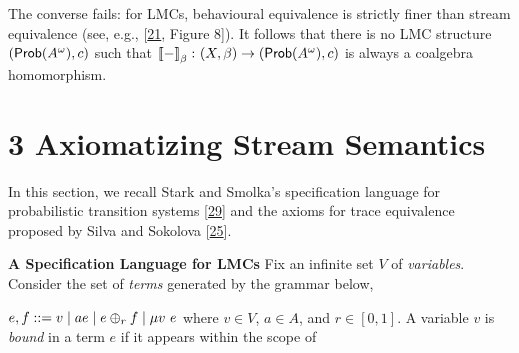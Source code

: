 \documentclass[11pt,a4paper]{amsart}
\begin{document}
\par\medskip
\hypertarget{html:S2.SS0.SSS0.P0.SPx3.p5}{} The converse fails: for LMCs, behavioural equivalence is strictly finer than stream equivalence (see, e.g., [\hyperlink{html:bib.bib21}{21}, Figure 8]). It follows that there is no LMC structure %
\hypertarget{html:S2.SS0.SSS0.P0.SPx3.p5.m1}{}\({(\text{\sf Prob}(A^{\omega}),c)}\) such that %
\hypertarget{html:S2.SS0.SSS0.P0.SPx3.p5.m2}{}\({\left\llbracket{-}\right\rrbracket_{\beta}\colon(X,\beta)\to(\text{\sf Prob}(A^{\omega}),c)}\) is always a coalgebra homomorphism.
\par\medskip
   
%
\hypertarget{html:S3}{} \section*{3 Axiomatizing Stream Semantics}
\hypertarget{html:S3.p1}{} In this section, we recall Stark and Smolka’s specification language for probabilistic transition systems [\hyperlink{html:bib.bib29}{29}] and the axioms for trace equivalence proposed by Silva and Sokolova [\hyperlink{html:bib.bib25}{25}].
\par\medskip
\hypertarget{html:S3.SS0.SSS0.Px1}{} \par\noindent\textbf{A Specification Language for LMCs}\quad  %
\hypertarget{html:S3.SS0.SSS0.Px1.p1}{} Fix an infinite set %
\hypertarget{html:S3.SS0.SSS0.Px1.p1.m1}{}\({V}\) of \emph{variables}. Consider the set of \emph{terms} generated by the grammar below,
\par\medskip
\hypertarget{html:S8.EGx1}{} %
\hypertarget{html:S3.Ex1}{}  %
\hypertarget{html:S3.Ex1.m1}{}\({\displaystyle e,f::=v\mid ae\mid e\oplus_{r}f\mid\mu v\leavevmode\nobreak\ e}\)    where %
\hypertarget{html:S3.SS0.SSS0.Px1.p1.m2}{}\({v\in V}\), %
\hypertarget{html:S3.SS0.SSS0.Px1.p1.m3}{}\({a\in A}\), and %
\hypertarget{html:S3.SS0.SSS0.Px1.p1.m4}{}\({r\in[0,1]}\). A variable %
\hypertarget{html:S3.SS0.SSS0.Px1.p1.m5}{}\({v}\) is \emph{bound} in a term %
\hypertarget{html:S3.SS0.SSS0.Px1.p1.m6}{}\({e}\) if it appears within the scope of %
\end{document}

